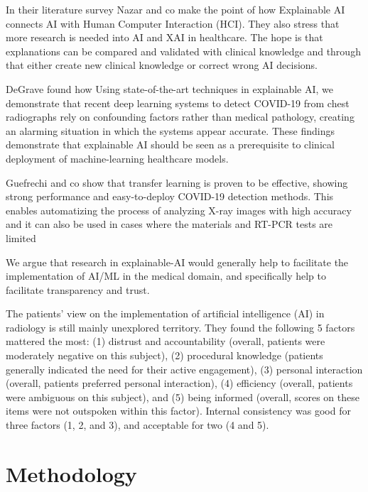 \documentclass[manuscript,screen,review]{acmart}
\begin{document}
In their literature survey Nazar and co make the point of how Explainable AI connects AI with Human Computer Interaction (HCI).
They also stress that more research is needed into AI and XAI in healthcare.
The hope is that explanations can be compared and validated with clinical knowledge and through that either create new
clinical knowledge or correct wrong AI decisions.\cite{Nazar2021}

DeGrave found how Using state-of-the-art techniques in explainable AI, we demonstrate that recent deep learning systems to detect COVID-19 from chest radiographs rely on confounding factors rather than medical pathology, creating an alarming situation in which the systems appear accurate.
These findings demonstrate that explainable AI should be seen as a prerequisite to clinical deployment of machine-learning healthcare models\cite{DeGrave2021}.

Guefrechi and co show that transfer learning is proven to be effective, showing strong performance and easy-to-deploy COVID-19 detection methods.
This enables automatizing the process of analyzing X-ray images with high accuracy and it can also be used in cases where the materials and RT-PCR tests are limited\cite{Guefrechi2021}

We argue that research in explainable-AI would generally help to facilitate the implementation of AI/ML in the medical domain, and specifically help to facilitate transparency and trust.\cite{Holzinger2017}

The patients' view on the implementation of artificial intelligence (AI) in radiology is still mainly unexplored territory.
They found the following 5 factors mattered the most: (1) distrust and accountability (overall, patients were moderately negative on this subject), (2) procedural knowledge (patients generally indicated the need for their active engagement), (3) personal interaction (overall, patients preferred personal interaction), (4) efficiency (overall, patients were ambiguous on this subject), and (5) being informed (overall, scores on these items were not outspoken within this factor).
Internal consistency was good for three factors (1, 2, and 3), and acceptable for two (4 and 5)\cite{Ongena2020}.



\section{Methodology}\label{sec:methodology}
\end{document}
